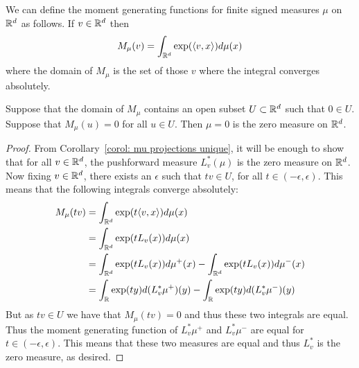 \documentclass[twoside, a4paper, 10pt]{amsart}
\begin{document}
We can define the moment generating functions for finite signed measures $\mu$ on $\mathbb{R}^d$ as follows. If $v \in \mathbb{R}^d$ then $$M_{\mu}(v) = \int_{\mathbb{R}^d} \exp(\langle v, x \rangle) d\mu(x)$$ where the domain of $M_{\mu}$ is the set of those $v$ where the integral converges absolutely.

\begin{thm}\label{thm: mgf zero} Suppose that the domain of $M_{\mu}$ contains an open subset $U \subset \mathbb{R}^d$ such that $0 \in U$. Suppose that $M_{\mu}(u) = 0$ for all $u \in U$. Then $\mu = 0$ is the zero measure on $\mathbb{R}^d$.

\end{thm}  

\begin{proof} From Corollary~\ref{corol: mu projections unique}, it will be enough to show that for all $v \in \mathbb{R}^d$, the pushforward measure $L_v^*(\mu)$ is the zero measure on $\mathbb{R}^d$. Now fixing $v \in \mathbb{R}^d$, there exists an $\epsilon$ such that $tv \in U$, for all $t \in (-\epsilon, \epsilon)$.  This means that the following integrals converge absolutely: 
\begin{align*} M_{\mu}(tv) &= \int_{\mathbb{R}^d} \exp(t \langle v, x \rangle) d\mu(x) \\ 
&= \int_{\mathbb{R}^d} \exp(t L_v(x)) d\mu(x) \\
&= \int_{\mathbb{R}^d} \exp(t L_v(x)) d\mu^+(x) - \int_{\mathbb{R}^d} \exp(t L_v(x)) d\mu^-(x) \\
&=  \int_{\mathbb{R}} \exp(t y) d(L^*_v\mu^+)(y) -  \int_{\mathbb{R}} \exp(t y) d(L^*_v\mu^-)(y)
\end{align*} 
But as $tv \in U$ we have that $M_{\mu}(tv) = 0$ and thus these two integrals are equal. Thus the moment generating function of $L^*_v \mu^{+}$ and $L^*_v \mu^{-}$ are equal for $t \in (-\epsilon, \epsilon)$. This means that these two measures are equal and thus $L^*_v$ is the zero measure, as desired. \end{proof}
\end{document}
